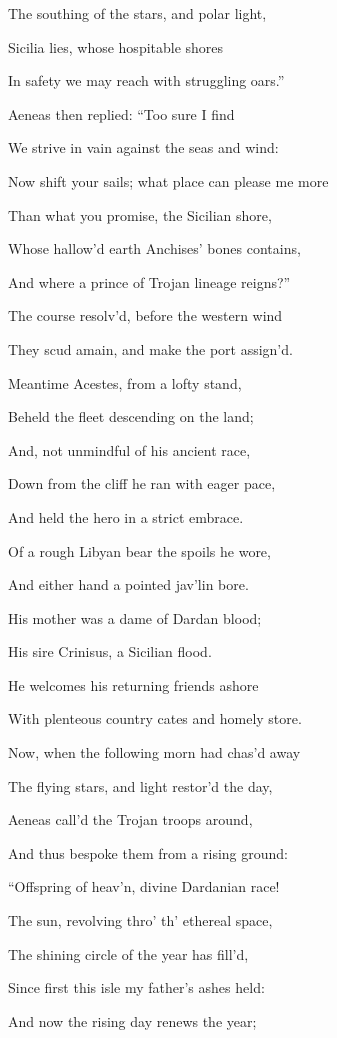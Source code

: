 The southing of the stars, and polar light,

Sicilia lies, whose hospitable shores

In safety we may reach with struggling oars.”

Aeneas then replied: “Too sure I find

We strive in vain against the seas and wind:

Now shift your sails; what place can please me more

Than what you promise, the Sicilian shore,

Whose hallow’d earth Anchises’ bones contains,

And where a prince of Trojan lineage reigns?”

The course resolv’d, before the western wind

They scud amain, and make the port assign’d.

Meantime Acestes, from a lofty stand,

Beheld the fleet descending on the land;

And, not unmindful of his ancient race,

Down from the cliff he ran with eager pace,

And held the hero in a strict embrace.

Of a rough Libyan bear the spoils he wore,

And either hand a pointed jav’lin bore.

His mother was a dame of Dardan blood;

His sire Crinisus, a Sicilian flood.

He welcomes his returning friends ashore

With plenteous country cates and homely store.

Now, when the following morn had chas’d away

The flying stars, and light restor’d the day,

Aeneas call’d the Trojan troops around,

And thus bespoke them from a rising ground:

“Offspring of heav’n, divine Dardanian race!

The sun, revolving thro’ th’ ethereal space,

The shining circle of the year has fill’d,

Since first this isle my father’s ashes held:

And now the rising day renews the year;

